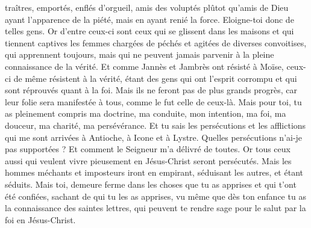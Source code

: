 \begin{multicols}{2}
traîtres, emportés, enflés d'orgueil, amis des voluptés plûtot qu'amis de Dieu
ayant l'apparence de la piété, mais en ayant renié la force. Eloigne-toi donc de telles gens.
Or d'entre ceux-ci sont ceux qui se glissent dans les maisons et qui tiennent captives les femmes chargées de péchés et agitées de diverses convoitises,
qui apprennent toujours, mais qui ne peuvent jamais parvenir à la pleine connaissance de la vérité.
Et comme Jannès et Jambrès ont résisté à Moïse, ceux-ci de même résistent à la vérité, étant des gens qui ont l'esprit corrompu et qui sont réprouvés quant à la foi.
Mais ils ne feront pas de plus grands progrès, car leur folie sera manifestée à tous, comme le fut celle de ceux-là.
Mais pour toi, tu as pleinement compris ma doctrine, ma conduite, mon intention, ma foi, ma douceur, ma charité, ma persévérance.
Et tu sais les persécutions et les afflictions qui me sont arrivées à Antioche, à Icone et à Lystre. Quelles persécutions n'ai-je pas supportées ? Et comment le Seigneur m'a délivré de toutes.
Or tous ceux aussi qui veulent vivre pieusement en Jésus-Christ seront persécutés.
Mais les hommes méchants et imposteurs iront en empirant, séduisant les autres, et étant séduits.
Mais toi, demeure ferme dans les choses que tu as apprises et qui t'ont été confiées, sachant de qui tu les as apprises,
vu même que dès ton enfance tu as la connaissance des saintes lettres, qui peuvent te rendre sage pour le salut par la foi en Jésus-Christ.

\end{multicols}
